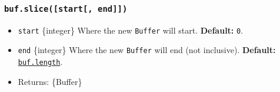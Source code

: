 \begin{Shaded}
\begin{Highlighting}[]
\NormalTok{ \{ }\NormalTok{ \} }\OperatorTok{=} \NormalTok{(}\NormalTok{)}\OperatorTok{;}

\OperatorTok{=} \NormalTok{(}\NormalTok{)}\OperatorTok{;}

\NormalTok{(}\OperatorTok{{-}}\OperatorTok{,} \OperatorTok{{-}}\NormalTok{)}\NormalTok{())}\OperatorTok{;}

\NormalTok{(}\OperatorTok{{-}}\OperatorTok{,} \OperatorTok{{-}}\NormalTok{)}\NormalTok{())}\OperatorTok{;}

\NormalTok{(}\OperatorTok{{-}}\OperatorTok{,} \OperatorTok{{-}}\NormalTok{)}\NormalTok{())}\OperatorTok{;}
\end{Highlighting}
\end{Shaded}

\subsubsection{\texorpdfstring{\texttt{buf.slice({[}start{[},\ end{]}{]})}}{buf.slice({[}start{[}, end{]}{]})}}\label{buf.slicestart-end}

\begin{itemize}
\tightlist
\item
  \texttt{start} \{integer\} Where the new \texttt{Buffer} will start.
  \textbf{Default:} \texttt{0}.
\item
  \texttt{end} \{integer\} Where the new \texttt{Buffer} will end (not
  inclusive). \textbf{Default:}
  \hyperref[buflength]{\texttt{buf.length}}.
\item
  Returns: \{Buffer\}
\end{itemize}

